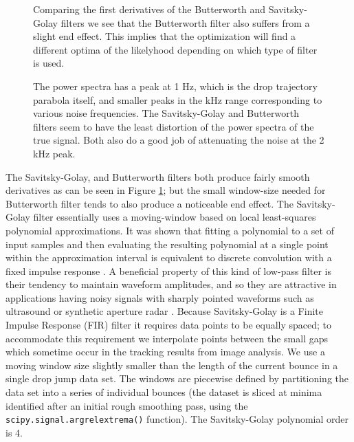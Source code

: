 \documentclass[12pt,a4paper,oneside]{book}
\begin{document}
\begin{figure}
    \centering
    
    \caption{Comparing the first derivatives of the Butterworth and Savitsky-Golay filters we see that the Butterworth filter also suffers from a slight end effect. This implies that the optimization will find a different optima of the likelyhood depending on which type of filter is used.\label{fig:dy_filtered}}
\end{figure}

\begin{figure}
    \centering
    
    \caption{The power spectra has a peak at 1 Hz, which is the drop trajectory parabola itself, and smaller peaks in the kHz range corresponding to various noise frequencies. The Savitsky-Golay and Butterworth filters seem to have the least distortion of the power spectra of the true signal. Both also do a good job of attenuating the noise at the 2 kHz peak. \label{fig:power}}
\end{figure}
The Savitsky-Golay, and Butterworth filters both produce fairly smooth derivatives as can be seen in Figure \ref{fig:dy_filtered}; but the small window-size needed for Butterworth filter tends to also produce a noticeable end effect. The Savitsky-Golay filter essentially uses a moving-window based on local least-squares polynomial approximations. It was shown that fitting a polynomial to a set of input samples and then evaluating the resulting polynomial at a single point within the approximation interval is equivalent to discrete convolution with a fixed impulse response \cite{savitzky_smoothing_1964}. A beneficial property of this kind of low-pass filter is their tendency to maintain waveform amplitudes, and so they are attractive in applications having noisy signals with sharply pointed waveforms such as ultrasound or synthetic aperture radar \cite{schafer_what_2011}. Because Savitsky-Golay is a Finite Impulse Response (FIR) filter it requires data points to be equally spaced; to accommodate this requirement we interpolate points between the small gaps which sometime occur in the tracking results from image analysis. We use a moving window size slightly smaller than the length of the current bounce in a single drop jump data set. The windows are piecewise defined by partitioning the data set into a series of individual bounces (the dataset is sliced at minima identified after an initial rough smoothing pass, using the \verb|scipy.signal.argrelextrema()| function). The Savitsky-Golay polynomial order is 4. 
\end{document}
